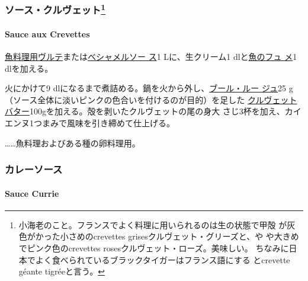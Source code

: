 \begin{recette}
\hypertarget{ux30bdux30fcux30b9ux30afux30ebux30f4ux30a7ux30c3ux30c840}{%
\subsubsection[ソース・クルヴェット]{\texorpdfstring{ソース・クルヴェット\footnote{小海老のこと。フランスでよく料理に用いられるのは生の状態で甲殻
  が灰色がかった小さめのcrevettes grisesクルヴェット・グリーズと、や
  や大きめでピンク色のcrevettes rosesクルヴェット・ローズ。美味しい。
  ちなみに日本でよく食べられているブラックタイガーはフランス語にする
  とcrevette géante tigréeと言う。}}{ソース・クルヴェット}}\label{ux30bdux30fcux30b9ux30afux30ebux30f4ux30a7ux30c3ux30c840}}

\hypertarget{sauce-aux-crevettes}{%
\paragraph{Sauce aux Crevettes}\label{sauce-aux-crevettes}}


\protect\hyperlink{veloute-de-poisson}{魚料理用ヴルテ}または\protect\hyperlink{sauce-bechamel}{ベシャメルソー
ス}1 Lに、生クリーム1\undemi{}
dlと\protect\hyperlink{fumet-de-poisson}{魚のフュ メ}1\undemi{}
dlを加える。

火にかけて9
dlになるまで煮詰める。鍋を火から外し、\protect\hyperlink{}{ブール・ルー
ジュ}25 g（ソース全体に淡いピンクの色合いを付けるのが目的）を足した
\protect\hyperlink{}{クルヴェットバター}100gを加える。殻を剥いたクルヴェットの尾の身大
さじ3杯を加え、カイエンヌ1つまみで風味を引き締めて仕上げる。

\ldots{}\ldots{}魚料理およびある種の卵料理用。

\maeaki

\hypertarget{ux30abux30ecux30fcux30bdux30fcux30b9}{%
\subsubsection{カレーソース}\label{ux30abux30ecux30fcux30bdux30fcux30b9}}

\hypertarget{sauce-currie}{%
\paragraph{Sauce Currie}\label{sauce-currie}}


\end{recette}

